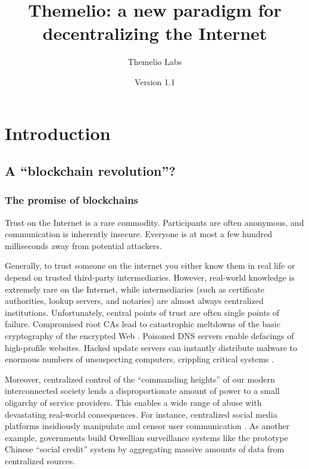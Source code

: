 \documentclass[headinclude,12pt]{scrbook}
\begin{document}
\raggedbottom
\title{Themelio: a new paradigm for decentralizing the Internet}
\author{Themelio Labs}
\date{Version 1.1}
\maketitle



\tableofcontents


\chapter{Introduction}

\section{A ``blockchain revolution''?}

\subsection{The promise of blockchains}

Trust on the Internet is a rare commodity. Participants are often anonymous, and communication is inherently insecure. Everyone is at most a few hundred milliseconds away from potential attackers.

Generally, to trust someone on the internet you either know them in real life or depend on trusted third-party intermediaries. However, real-world knowledge is extremely rare on the Internet, while intermediaries (such as certificate authorities, lookup servers, and notaries) are almost always centralized institutions. Unfortunately, central points of trust are often single points of failure. Compromised root CAs lead to catastrophic meltdowns of the basic cryptography of the encrypted Web \cite{prins2011diginotar}. Poisoned DNS servers enable defacings of high-profile websites. Hacked update servers can instantly distribute malware to enormous numbers of unsuspecting computers, crippling critical systems \cite{richardson2017ransomware}.

Moreover, centralized control of the ``commanding heights'' of our modern interconnected society lends a disproportionate amount of power to a small oligarchy of service providers. This enables a wide range of abuse with devastating real-world consequences. For instance, centralized social media platforms insidiously manipulate and censor user communication \cite{sunstein2018republic}. As another example, governments build Orwellian surveillance systems like the prototype Chinese ``social credit'' system \cite{wang11china} by aggregating massive amounts of data from centralized sources.
\end{document}
